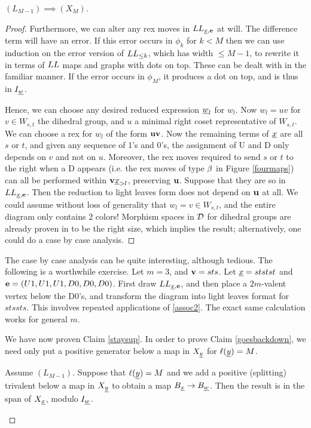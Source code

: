 \begin{proof}[$(L_{M-1}) \implies (X_M)$]
\begin{proof}
Furthermore, we can alter any rex moves in $LL_{{\underline{x}},{\mathbf e}}$ at will. The difference term will have an error. If this error occurs in $\phi_k$ for $k<M$ then we can use induction on the
error version of $LL_{\le k}$, which has width $\le M-1$, to rewrite it in terms of $LL$ maps and graphs with dots on top. These can be dealt with in the familiar manner. If the error occurs in $\phi_M$, it produces a dot on top, and is thus in $I_{\underline{w}}$.

Hence, we can choose any desired reduced expression ${\underline{w}}_l$ for $w_l$. Now $w_l = uv$ for $v \in W_{s,t}$ the dihedral group, and $u$ a minimal right coset representative of $W_{s,t}$. We
can choose a rex for $w_l$ of the form ${\mathbf u} {\mathbf v}$. Now the remaining terms of ${\underline{x}}$ are all $s$ or $t$, and given any sequence of 1's and 0's, the assignment of U and D only depends on $v$
and not on $u$. Moreover, the rex moves required to send $s$ or $t$ to the right when a D appears (i.e. the rex moves of type $\beta$ in Figure \ref{fourmaps}) can all be performed within
${\mathbf v} {\underline{x}}_{>l}$, preserving ${\mathbf u}$. Suppose that they are so in $LL_{{\underline{x}},{\mathbf e}}$. Then the reduction to light leaves form does not depend on ${\mathbf u}$ at all. We could assume without loss of
generality that $w_l=v \in W_{s,t}$, and the entire diagram only contains $2$ colors! Morphism spaces in ${\mathcal{D}}$ for dihedral groups are already proven in \cite{EDihedral} to be the right
size, which implies the result; alternatively, one could do a case by case analysis. \end{proof}

\begin{remark} The case by case analysis can be quite interesting, although tedious. The following is a worthwhile exercise. Let $m=3$, and ${\mathbf v}=sts$. Let ${\underline{x}}=ststst$ and
${\mathbf e}=(U1,U1,U1,D0,D0,D0)$. First draw $LL_{{\underline{x}},{\mathbf e}}$, and then place a $2m$-valent vertex below the D0's, and transform the diagram into light leaves format for $stssts$. This involves
repeated applications of \eqref{assoc2}. The exact same calculation works for general $m$. \end{remark}

We have now proven Claim \ref{staysup}. In order to prove Claim \ref{goesbackdown}, we need only put a positive generator below a map in $X_{\underline{y}}$ for $\ell({\underline{y}})=M$.

\begin{claim} \label{addpostri} Assume $(L_{M-1})$. Suppose that $\ell({\underline{y}})=M$ and we add a positive (splitting) trivalent below a map in $X_{\underline{y}}$ to obtain a map $B_{\underline{x}} \rightarrow
B_{\underline{w}}$. Then the result is in the span of $X_{\underline{x}}$, modulo $I_{\underline{w}}$. \end{claim}


\end{proof}
